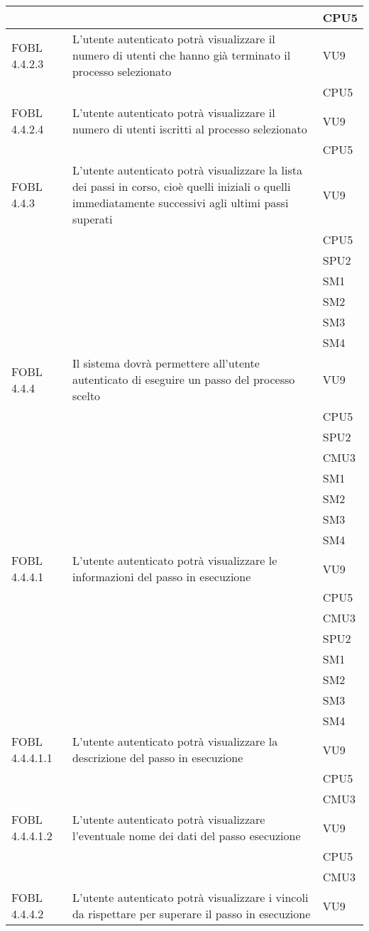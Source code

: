 \begin{longtable}{lXl}
&&CPU5\\
\midrule
FOBL 4.4.2.3&L'utente autenticato potrà visualizzare il numero di utenti che hanno già terminato il processo selezionato&VU9\\
&&CPU5\\
\midrule
FOBL 4.4.2.4&L'utente autenticato potrà visualizzare il numero di utenti iscritti al processo selezionato&VU9\\
&&CPU5\\
\midrule
FOBL 4.4.3&L'utente autenticato potrà visualizzare la lista dei passi in corso, cioè quelli iniziali o quelli immediatamente successivi agli ultimi passi superati&VU9\\
&&CPU5\\
&&SPU2\\
&&SM1\\
&&SM2\\
&&SM3\\
&&SM4\\
\midrule
FOBL 4.4.4&Il sistema dovrà permettere all'utente autenticato di eseguire un passo del processo scelto&VU9\\
&&CPU5\\
&&SPU2\\
&&CMU3\\
&&SM1\\
&&SM2\\
&&SM3\\
&&SM4\\
\midrule
FOBL 4.4.4.1&L'utente autenticato potrà visualizzare le informazioni del passo in esecuzione&VU9\\
&&CPU5\\
&&CMU3\\
&&SPU2\\
&&SM1\\
&&SM2\\
&&SM3\\
&&SM4\\
\midrule
FOBL 4.4.4.1.1&L'utente autenticato potrà visualizzare la descrizione del passo in esecuzione&VU9\\
&&CPU5\\
&&CMU3\\
\midrule
FOBL 4.4.4.1.2&L'utente autenticato potrà visualizzare l'eventuale nome dei dati del passo esecuzione&VU9\\
&&CPU5\\
&&CMU3\\
\midrule
FOBL 4.4.4.2&L'utente autenticato potrà visualizzare i vincoli da rispettare per superare il passo in esecuzione&VU9\\

\end{longtable}
